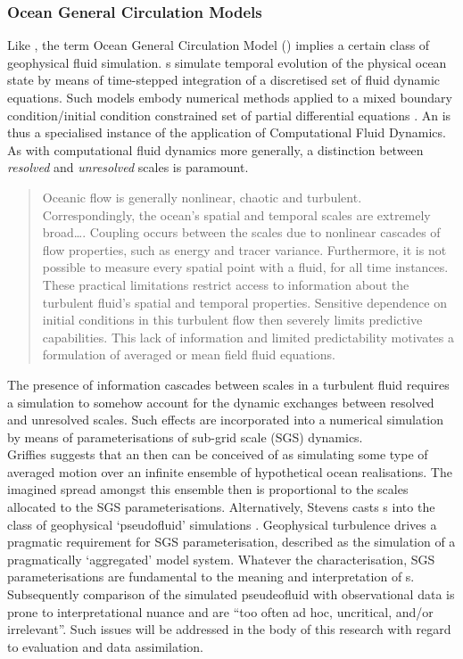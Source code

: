 \subsubsection{Ocean General Circulation Models}

Like \NWP, the term Ocean General Circulation Model (\OGCM{}) implies a certain class of geophysical fluid simulation.  \OGCM{}s simulate temporal evolution of the physical ocean state by means of time-stepped integration of a discretised set of fluid dynamic equations.  Such models embody numerical methods applied to a mixed boundary condition/initial condition constrained set of partial differential equations  \citep{Griffies:2004vs}.  An \OGCM{} is thus a specialised instance of the application of Computational Fluid Dynamics.\\



As with computational fluid dynamics more generally, a distinction between \emph{resolved} and \emph{unresolved} scales is paramount.   
\begin{quotation}
\noindent
Oceanic flow is generally nonlinear, chaotic and turbulent.  Correspondingly, the ocean's spatial and temporal scales are extremely broad\dots{}.  Coupling occurs between the scales due to nonlinear cascades of flow properties, such as energy and tracer variance.  Furthermore, it is not possible to measure every spatial point with a fluid, for all time instances.  These practical limitations restrict access to information about the turbulent fluid's spatial and temporal properties.  Sensitive dependence on initial conditions in this turbulent flow then severely limits predictive capabilities.  This lack of information and limited predictability motivates a formulation of averaged or mean field fluid equations.\citep[Sec 2.5]{Griffies:2004vs}
\end{quotation}
The presence of information cascades between scales in a turbulent fluid requires a simulation to somehow account for the dynamic exchanges between resolved and unresolved scales.  Such effects are incorporated into a numerical simulation by means of parameterisations of sub-grid scale (SGS) dynamics.\\
Griffies suggests that an \OGCM{} then can be conceived of as simulating some type of averaged motion over an infinite ensemble of hypothetical ocean realisations.  The imagined spread amongst this ensemble then is proportional to  the scales allocated to the SGS parameterisations.
Alternatively, Stevens casts \OGCM{}s into the class of geophysical `pseudofluid' simulations \citep{Stevens:2001kb}.   Geophysical turbulence drives a pragmatic requirement for SGS parameterisation, described as the simulation of a pragmatically `aggregated' model system.   Whatever the characterisation, SGS parameterisations are fundamental to the meaning and interpretation of \OGCM{}s.   Subsequently comparison of the simulated pseudeofluid with observational data is prone to interpretational nuance and are ``too often ad hoc, uncritical, and/or irrelevant''\citep[pp 286]{Stevens:2001kb}.   Such issues will be addressed in the body of this research with regard to evaluation and data assimilation.\\


